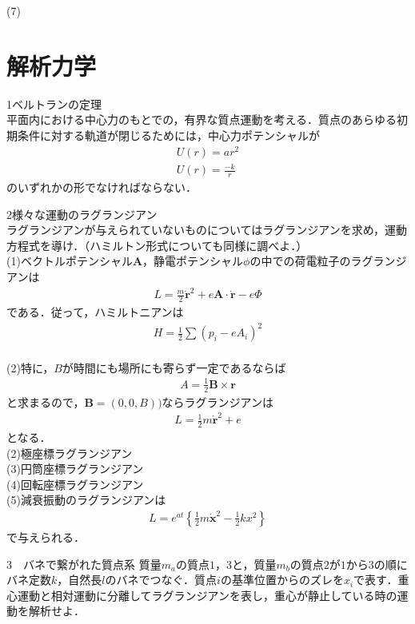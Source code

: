 \documentclass[a4j]{jarticle}
\begin{document}
(7)

 \section{解析力学}

1ベルトランの定理\\
平面内における中心力のもとでの，有界な質点運動を考える．質点のあらゆる初期条件に対する軌道が閉じるためには，中心力ポテンシャルが
\begin{align*}
 U(r)=ar^2\\
 U(r)=\frac{-k}{r}
\end{align*}
のいずれかの形でなければならない．




2様々な運動のラグランジアン\\
ラグランジアンが与えられていないものについてはラグランジアンを求め，運動方程式を導け．（ハミルトン形式についても同様に調べよ．）\\
(1)ベクトルポテンシャル$\bm{A}$，静電ポテンシャル$\phi$の中での荷電粒子のラグランジアンは
\begin{align*}
 L=\frac{m}{2}\bm{\dot{r}}^2+e\bm{A}\cdot\bm{\dot{r}}-e\Phi
\end{align*}
である．従って，ハミルトニアンは
\begin{align*}
 H=\frac{1}{2}\sum(p_i-eA_i)^2
\end{align*}
\\
(2)特に，$B$が時間にも場所にも寄らず一定であるならば
\begin{align*}
 A=\frac{1}{2}\bm{B}\times\bm{r}
\end{align*}
と求まるので，$\bm{B}=(0,0,B))$ならラグランジアンは
\begin{align*}
 L=\frac{1}{2}m\bm{\dot{r}}^2+e
\end{align*}
となる．
\\

(2)極座標ラグランジアン\\
(3)円筒座標ラグランジアン\\
(4)回転座標ラグランジアン\\
(5)減衰振動のラグランジアンは
\begin{align*}
 L=e^{at}\left\{\frac{1}{2}m\bm{\dot{x}}^2-\frac{1}{2}kx^2\right\}
\end{align*}
で与えられる．




3　バネで繋がれた質点系
質量$m_a$の質点$1$，$3$と，質量$m_b$の質点$2$が$1$から$3$の順にバネ定数$k$，自然長$l$のバネでつなぐ．質点$i$の基準位置からのズレを$x_i$で表す．重心運動と相対運動に分離してラグランジアンを表し，重心が静止している時の運動を解析せよ．\\
\end{document}
